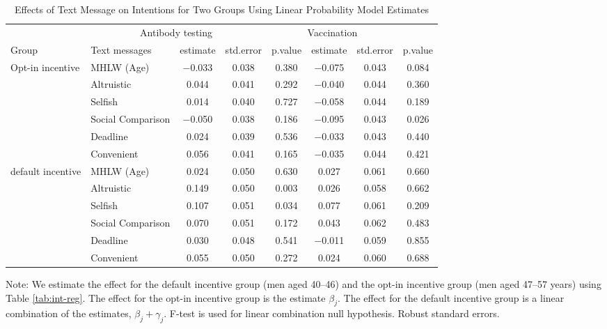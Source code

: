 \begin{table}

\caption{Effects of Text Message on Intentions for Two Groups Using Linear Probability Model Estimates \label{tab:int-reg-ftest}}
\centering
\fontsize{9}{11}\selectfont
\begin{threeparttable}
\begin{tabular}[t]{>{\raggedright\arraybackslash}p{5em}lcccccc}
\toprule
\multicolumn{2}{c}{ } & \multicolumn{3}{c}{Antibody testing} & \multicolumn{3}{c}{Vaccination} \\
\cmidrule(l{3pt}r{3pt}){3-5} \cmidrule(l{3pt}r{3pt}){6-8}
Group & Text messages & estimate & std.error & p.value & estimate  & std.error  & p.value \\
\midrule
Opt-in incentive & MHLW (Age) & \num{-0.033} & \num{0.038} & \num{0.380} & \num{-0.075} & \num{0.043} & \num{0.084}\\
 & Altruistic & \num{0.044} & \num{0.041} & \num{0.292} & \num{-0.040} & \num{0.044} & \num{0.360}\\
 & Selfish & \num{0.014} & \num{0.040} & \num{0.727} & \num{-0.058} & \num{0.044} & \num{0.189}\\
 & Social Comparison & \num{-0.050} & \num{0.038} & \num{0.186} & \num{-0.095} & \num{0.043} & \num{0.026}\\
 & Deadline & \num{0.024} & \num{0.039} & \num{0.536} & \num{-0.033} & \num{0.043} & \num{0.440}\\
 & Convenient & \num{0.056} & \num{0.041} & \num{0.165} & \num{-0.035} & \num{0.044} & \num{0.421}\\
default incentive & MHLW (Age) & \num{0.024} & \num{0.050} & \num{0.630} & \num{0.027} & \num{0.061} & \num{0.660}\\
 & Altruistic & \num{0.149} & \num{0.050} & \num{0.003} & \num{0.026} & \num{0.058} & \num{0.662}\\
 & Selfish & \num{0.107} & \num{0.051} & \num{0.034} & \num{0.077} & \num{0.061} & \num{0.209}\\
 & Social Comparison & \num{0.070} & \num{0.051} & \num{0.172} & \num{0.043} & \num{0.062} & \num{0.483}\\
 & Deadline & \num{0.030} & \num{0.048} & \num{0.541} & \num{-0.011} & \num{0.059} & \num{0.855}\\
 & Convenient & \num{0.055} & \num{0.050} & \num{0.272} & \num{0.024} & \num{0.060} & \num{0.688}\\
\bottomrule
\end{tabular}
\begin{tablenotes}
\item Note: We estimate the effect for the default incentive group (men aged 40--46) and the opt-in incentive group (men aged 47--57 years) using  Table \ref{tab:int-reg}. The effect for the opt-in incentive group is the estimate $\beta_j$. The effect for the default incentive group is a linear combination of the estimates, $\beta_j + \gamma_j$. F-test is used for linear combination null hypothesis. Robust standard errors.
\end{tablenotes}
\end{threeparttable}
\end{table}
